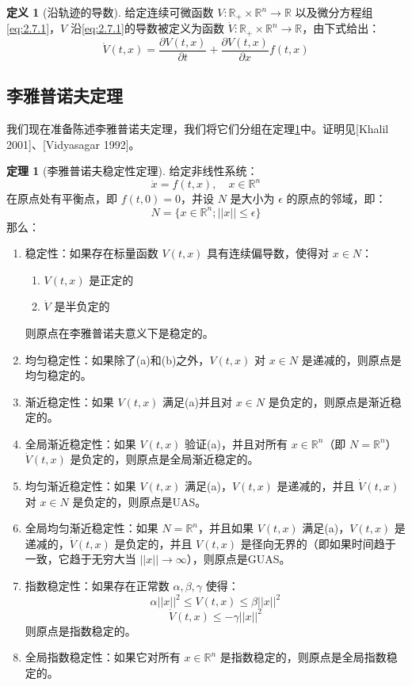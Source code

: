\documentclass[UTF8,12pt,a4paper]{ctexart}
\theoremstyle{definition}
\newtheorem{definition}{定义}[section]
\newtheorem{theorem}{定理}[section]
\begin{document}
\begin{definition}[沿轨迹的导数]
给定连续可微函数 $V: \mathbb{R}_+ \times \mathbb{R}^n \rightarrow \mathbb{R}$ 以及微分方程组\eqref{eq:2.7.1}，$V$ 沿\eqref{eq:2.7.1}的导数被定义为函数 $\dot{V}: \mathbb{R}_+ \times \mathbb{R}^n \rightarrow \mathbb{R}$，由下式给出：
\[
\dot{V}(t, x) = \frac{\partial V(t, x)}{\partial t} + \frac{\partial V(t, x)}{\partial x} f(t, x)
\]
\end{definition}

\subsection{李雅普诺夫定理}

我们现在准备陈述李雅普诺夫定理，我们将它们分组在定理\ref{thm:lyapunov}中。证明见[Khalil 2001]、[Vidyasagar 1992]。

\begin{theorem}[李雅普诺夫稳定性定理]\label{thm:lyapunov}
给定非线性系统：
\[
\dot{x} = f(t, x), \quad x \in \mathbb{R}^n
\]
在原点处有平衡点，即 $f(t, 0)=0$，并设 $N$ 是大小为 $\epsilon$ 的原点的邻域，即：
\[
N = \{x \in \mathbb{R}^n; ||x|| \leq \epsilon\}
\]
那么：
\begin{enumerate}
\item 稳定性：如果存在标量函数 $V(t, x)$ 具有连续偏导数，使得对 $x \in N$：
\begin{enumerate}
\item $V(t, x)$ 是正定的
\item $\dot{V}$ 是半负定的
\end{enumerate}
则原点在李雅普诺夫意义下是稳定的。

\item 均匀稳定性：如果除了(a)和(b)之外，$V(t, x)$ 对 $x \in N$ 是递减的，则原点是均匀稳定的。

\item 渐近稳定性：如果 $V(t, x)$ 满足(a)并且对 $x \in N$ 是负定的，则原点是渐近稳定的。

\item 全局渐近稳定性：如果 $V(t, x)$ 验证(a)，并且对所有 $x \in \mathbb{R}^n$（即 $N=\mathbb{R}^n$）$\dot{V}(t, x)$ 是负定的，则原点是全局渐近稳定的。

\item 均匀渐近稳定性：如果 $V(t, x)$ 满足(a)，$V(t, x)$ 是递减的，并且 $\dot{V}(t, x)$ 对 $x \in N$ 是负定的，则原点是UAS。

\item 全局均匀渐近稳定性：如果 $N=\mathbb{R}^n$，并且如果 $V(t, x)$ 满足(a)，$V(t, x)$ 是递减的，$\dot{V}(t, x)$ 是负定的，并且 $V(t, x)$ 是径向无界的（即如果时间趋于一致，它趋于无穷大当 $||x|| \rightarrow \infty$），则原点是GUAS。

\item 指数稳定性：如果存在正常数 $\alpha, \beta, \gamma$ 使得：
\[
\alpha ||x||^2 \leq V(t, x) \leq \beta ||x||^2
\]
\[
\dot{V}(t, x) \leq -\gamma ||x||^2
\]
则原点是指数稳定的。

\item 全局指数稳定性：如果它对所有 $x \in \mathbb{R}^n$ 是指数稳定的，则原点是全局指数稳定的。
\end{enumerate}
\end{theorem}
\end{document}
